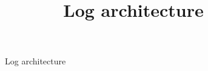 \documentclass[times, 10pt,twocolumn]{article}
\title{Log architecture}
\begin{document}
 


\begin{figure}
  \begin{center}
    \scalebox{0.8}{\mbox{}}%
    \caption{Log architecture \label{fig:log}}
 \end{center}
 \end{figure}
\end{document}
